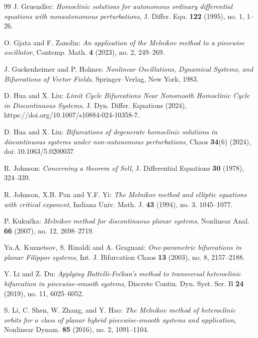 \documentclass[10pt]{article}
\numberwithin{equation}{section}
\theoremstyle{definition}
\theoremstyle{remark}
\begin{document}
\begin{thebibliography}{99}
 {\sc J. Gruendler}: {\it Homoclinic solutions for autonomous ordinary differential equations with nonautonomous perturbations},
J. Differ. Equ. {\bf 122} (1995), no. 1, 1--26.


 {\sc O. Gjata and F. Zanolin}: {\it An application of the Melnikov method to a piecewise oscillator},
Contemp. Math. {\bf 4} (2023), no. 2, 249--269.

 {\sc J. Guckenheimer and P. Holmes}: {\it Nonlinear Oscillations,
Dynamical Systems, and Bifurcations of Vector Fields},
Springer--Verlag, New York, 1983.



 {\sc D. Hua and X. Liu}: {\it Limit Cycle Bifurcations Near Nonsmooth Homoclinic Cycle in Discontinuous Systems},
J. Dyn.
Differ. Equations (2024), https://doi.org/10.1007/s10884-024-10358-7.



 {\sc D. Hua and X. Liu}: {\it Bifurcations of degenerate homoclinic solutions in discontinuous systems under non-autonomous perturbations}, Chaos {\bf 34}(6) (2024), doi: 10.1063/5.0200037



{\sc R. Johnson}: {\it Concerning a theorem of Sell}, J. Differential Equations \textbf{30} (1978),
324--339.	

 {\sc R. Johnson, X.B. Pan and Y.F. Yi}: {\it The Melnikov method and
elliptic equations with critical exponent},
Indiana Univ. Math. J. {\bf 43} (1994), no. 3, 1045--1077.

 {\sc P. Kuku\v cka}: {\it Melnikov method for discontinuous planar systems},
Nonlinear Anal. {\bf 66} (2007), no. 12, 2698--2719.

 {\sc Yu.A. Kuznetsov, S. Rinaldi and A. Gragnani}: {\it One-parametric bifurcations in planar Filippov systems},
Int. J. Bifurcation Chaos {\bf 13} (2003), no. 8, 2157--2188.

 {\sc  Y. Li and Z. Du}:
{\it Applying Battelli-Fe\v ckan's method to transversal heteroclinic bifurcation in piecewise-smooth systems}, Discrete Contin. Dyn. Syst.
Ser. B {\bf 24} (2019), no. 11,
6025--6052.

 {\sc S. Li, C. Shen, W. Zhang, and Y. Hao}: {\it The Melnikov method of heteroclinic orbits for a class of planar hybrid
    piecewise-smooth systems and
    application}, Nonlinear Dynam. \textbf{85} (2016), no. 2, 1091--1104.


\end{thebibliography}
\end{document}
